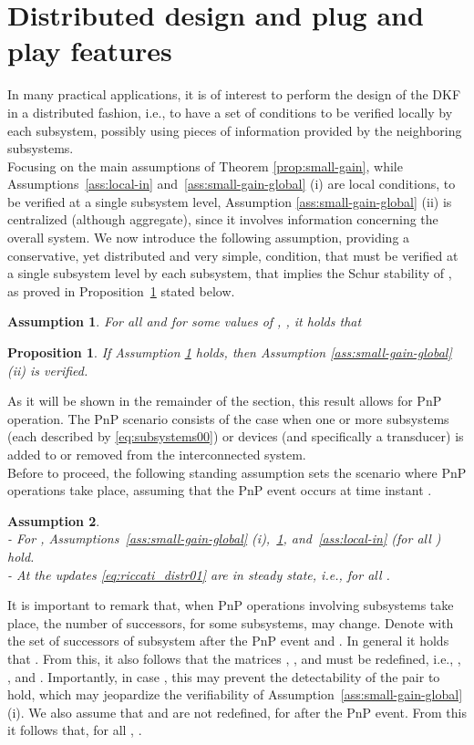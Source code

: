 \documentclass[journal,10pt,draftcls,onecolumn]{IEEEtran}
\newtheorem{proposition}{Proposition}
\newtheorem{assumption}{Assumption}
\begin{document}
\section{Distributed design and plug and play features}
\label{sec:d-design}
In many practical applications, it is of interest to perform the design of the DKF in a distributed fashion, i.e., to have a set of conditions to be verified locally by each subsystem, possibly using pieces of information provided by the neighboring subsystems.\\
Focusing on the main assumptions of Theorem \ref{prop:small-gain}, while Assumptions~\ref{ass:local-in} and~\ref{ass:small-gain-global} (i) are local conditions, to be verified at a single subsystem level, Assumption \ref{ass:small-gain-global} (ii) is centralized (although aggregate), since it involves information concerning the overall system.
We now introduce the following assumption, providing a conservative, yet distributed and very simple, condition, that must be verified at a single subsystem level by each subsystem, that implies the Schur stability of , as proved in Proposition~\ref{propo:Gamma-distributed} stated below.
\begin{assumption}
For all  and for some values of , , it holds that

\label{ass:small-gain-distributed}
\end{assumption}
\begin{proposition}
\label{propo:Gamma-distributed}
If Assumption \ref{ass:small-gain-distributed} holds, then Assumption \ref{ass:small-gain-global} (ii) is verified.\hfill
\end{proposition}
As it will be shown in the remainder of the section, this result allows for PnP operation.
The PnP scenario consists of the case when one or more subsystems (each described by \eqref{eq:subsystems00}) or devices (and specifically a transducer) is added to or removed from the interconnected system.\\
Before to proceed, the following standing assumption sets the scenario where PnP operations take place, assuming that the PnP event occurs at time instant .
\noindent
\begin{assumption}\hfill\\
- For , Assumptions~\ref{ass:small-gain-global} (i),~\ref{ass:small-gain-distributed}, and~\ref{ass:local-in} (for all ) hold.\\
- At  the updates \eqref{eq:riccati_distr01} are in steady state, i.e.,  for all .\hfill
\label{ass:PnP}
\end{assumption}
It is important to remark that, when PnP operations involving subsystems take place, the number of successors, for some subsystems, may change. Denote with  the set of successors of subsystem  after the PnP event and . In general it holds that . From this, it also follows that the matrices , , and  must be redefined, i.e., , , and .
Importantly, in case , this may prevent the detectability of the pair  to hold, which may jeopardize the verifiability of Assumption~\ref{ass:small-gain-global} (i). We also assume that  and  are not redefined, for  after the PnP event. From this it follows that, for all , .
\end{document}
